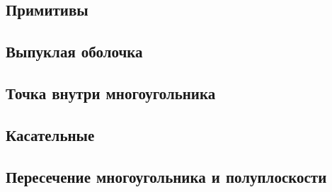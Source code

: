 \subsection{Примитивы}

\subsection{Выпуклая оболочка}

\subsection{Точка внутри многоугольника}

\subsection{Касательные}

\subsection{Пересечение многоугольника и полуплоскости}
